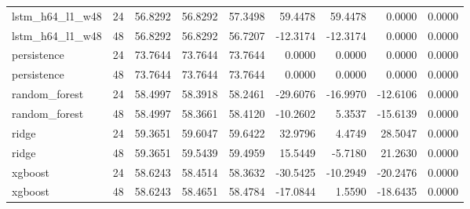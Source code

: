 \begin{table}[htbp]
\begin{tabular}{lrrrrrrrr}
lstm\_h64\_l1\_w48 & 24 & 56.8292 & 56.8292 & 57.3498 & 59.4478 & 59.4478 & 0.0000 & 0.0000 \\
lstm\_h64\_l1\_w48 & 48 & 56.8292 & 56.8292 & 56.7207 & -12.3174 & -12.3174 & 0.0000 & 0.0000 \\
persistence & 24 & 73.7644 & 73.7644 & 73.7644 & 0.0000 & 0.0000 & 0.0000 & 0.0000 \\
persistence & 48 & 73.7644 & 73.7644 & 73.7644 & 0.0000 & 0.0000 & 0.0000 & 0.0000 \\
random\_forest & 24 & 58.4997 & 58.3918 & 58.2461 & -29.6076 & -16.9970 & -12.6106 & 0.0000 \\
random\_forest & 48 & 58.4997 & 58.3661 & 58.4120 & -10.2602 & 5.3537 & -15.6139 & 0.0000 \\
ridge & 24 & 59.3651 & 59.6047 & 59.6422 & 32.9796 & 4.4749 & 28.5047 & 0.0000 \\
ridge & 48 & 59.3651 & 59.5439 & 59.4959 & 15.5449 & -5.7180 & 21.2630 & 0.0000 \\
xgboost & 24 & 58.6243 & 58.4514 & 58.3632 & -30.5425 & -10.2949 & -20.2476 & 0.0000 \\
xgboost & 48 & 58.6243 & 58.4651 & 58.4784 & -17.0844 & 1.5590 & -18.6435 & 0.0000 \\
\bottomrule
\end{tabular}
\end{table}
